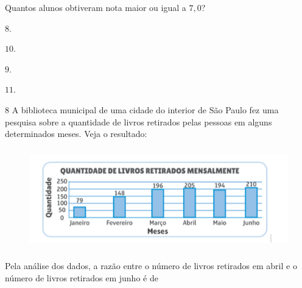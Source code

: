 Quantos alunos obtiveram nota maior ou igual a $7,0$?

\begin{escolha}
\item $8$.
\item $10$.
\item $9$.
\item $11$.
\end{escolha}



\num{8}  A biblioteca municipal de uma cidade do interior de São Paulo fez uma
pesquisa sobre a quantidade de livros retirados pelas pessoas em alguns
determinados meses. Veja o resultado:

\begin{figure}[H]
\centering
\includegraphics[width=5in,height=1.71875in]{./imgSAEB_6_MAT/media/image117.png}
\end{figure}

Pela análise dos dados, a razão entre o número de livros retirados em
abril e o número de livros retirados em junho é de

